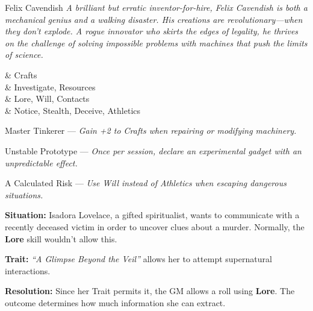 \begin{WyrdNPC}[float=!t]{Felix Cavendish}
	\emph{A brilliant but erratic inventor-for-hire, Felix Cavendish is both a mechanical genius and a walking disaster. His creations are revolutionary—when they don’t explode. A rogue innovator who skirts the edges of legality, he thrives on the challenge of solving impossible problems with machines that push the limits of science.}

	\vspace{0.5\baselineskip}

	\begin{SkillsBox}
		\Expert & Crafts \\
		\Skilled & Investigate, Resources \\
		\Novice & Lore, Will, Contacts \\
		\Untrained & Notice, Stealth, Deceive, Athletics \\
	\end{SkillsBox}

	\begin{TraitsBox}
		\item[Master Tinkerer] — \emph{Gain +2 to Crafts when repairing or modifying machinery.}
		\item[Unstable Prototype] — \emph{Once per session, declare an experimental gadget with an unpredictable effect.}
		\item[A Calculated Risk] — \emph{Use Will instead of Athletics when escaping dangerous situations.}
	  \end{TraitsBox}
\end{WyrdNPC}


\begin{WyrdExample}
	\textbf{Situation:} Isadora Lovelace, a gifted spiritualist, wants to communicate with a recently deceased victim in order to uncover clues about a murder. Normally, the \textbf{Lore} skill wouldn’t allow this.

	\noindent\textbf{Trait:} \emph{“A Glimpse Beyond the Veil”} allows her to attempt supernatural interactions.

	\noindent\textbf{Resolution:} Since her Trait permits it, the GM allows a roll using \textbf{Lore}. The outcome determines how much information she can extract.
\end{WyrdExample}

